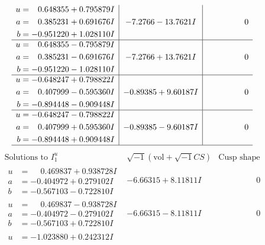 \documentclass[1p]{elsarticle_modified}
\theoremstyle{definition}
\newcommand{\I}{\sqrt{-1}}
\begin{document}
$$\begin{array}{c|c|c}
\begin{aligned}
u &= \phantom{-}0.648355 + 0.795879 I \\
a &= \phantom{-}0.385231 + 0.691676 I \\
b &= -0.951220 + 1.028110 I\end{aligned}
 & -7.2766 - 13.7621 I & \phantom{-0.000000 } 0 \\ \hline\begin{aligned}
u &= \phantom{-}0.648355 - 0.795879 I \\
a &= \phantom{-}0.385231 - 0.691676 I \\
b &= -0.951220 - 1.028110 I\end{aligned}
 & -7.2766 + 13.7621 I & \phantom{-0.000000 } 0 \\ \hline\begin{aligned}
u &= -0.648247 + 0.798822 I \\
a &= \phantom{-}0.407999 - 0.595360 I \\
b &= -0.894448 - 0.909448 I\end{aligned}
 & -0.89385 + 9.60187 I & \phantom{-0.000000 } 0 \\ \hline\begin{aligned}
u &= -0.648247 - 0.798822 I \\
a &= \phantom{-}0.407999 + 0.595360 I \\
b &= -0.894448 + 0.909448 I\end{aligned}
 & -0.89385 - 9.60187 I & \phantom{-0.000000 } 0\\
 \hline 
 \end{array}$$\newpage$$\begin{array}{c|c|c}  
\text{Solutions to }I^u_{1}& \I (\text{vol} + \sqrt{-1}CS) & \text{Cusp shape}\\
 \hline 
\begin{aligned}
u &= \phantom{-}0.469837 + 0.938728 I \\
a &= -0.404972 + 0.279102 I \\
b &= -0.567103 - 0.722810 I\end{aligned}
 & -6.66315 + 8.11811 I & \phantom{-0.000000 } 0 \\ \hline\begin{aligned}
u &= \phantom{-}0.469837 - 0.938728 I \\
a &= -0.404972 - 0.279102 I \\
b &= -0.567103 + 0.722810 I\end{aligned}
 & -6.66315 - 8.11811 I & \phantom{-0.000000 } 0 \\ \hline\begin{aligned}
u &= -1.023880 + 0.242312 I \\

\end{aligned}
\end{array}$$
\end{document}
